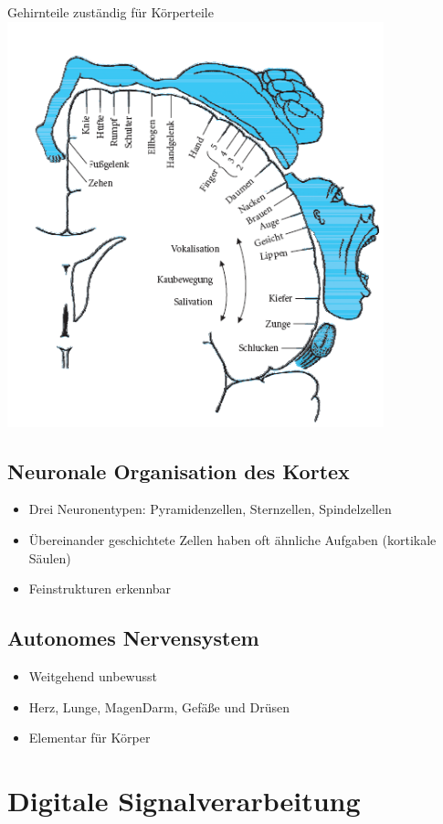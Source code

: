 \documentclass[a4paper,10pt,oneside]{article}
\begin{document}
Gehirnteile zuständig für Körperteile
\includegraphics[scale=0.65]{Grafiken/homunkulus.png}

\subsection{Neuronale Organisation des Kortex}
\begin{itemize}
	\item Drei Neuronentypen: Pyramidenzellen, Sternzellen, Spindelzellen
	\item Übereinander geschichtete Zellen haben oft ähnliche Aufgaben (kortikale Säulen)
	\item Feinstrukturen erkennbar
\end{itemize}

\subsection{Autonomes Nervensystem}
\begin{itemize}
	\item Weitgehend unbewusst
	\item Herz, Lunge, MagenDarm, Gefäße und Drüsen
	\item Elementar für Körper
\end{itemize}

\section{Digitale Signalverarbeitung}
\end{document}
